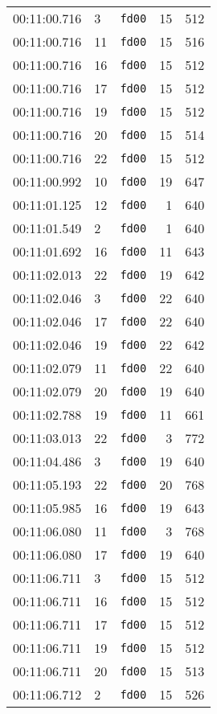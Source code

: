 \documentclass{article}
\begin{document}
\begin{longtable}{lllrr}
00:11:00.716 & 3 & \texttt{fd00} & 15 & 512 \\
00:11:00.716 & 11 & \texttt{fd00} & 15 & 516 \\
00:11:00.716 & 16 & \texttt{fd00} & 15 & 512 \\
00:11:00.716 & 17 & \texttt{fd00} & 15 & 512 \\
00:11:00.716 & 19 & \texttt{fd00} & 15 & 512 \\
00:11:00.716 & 20 & \texttt{fd00} & 15 & 514 \\
00:11:00.716 & 22 & \texttt{fd00} & 15 & 512 \\
00:11:00.992 & 10 & \texttt{fd00} & 19 & 647 \\
00:11:01.125 & 12 & \texttt{fd00} & 1 & 640 \\
00:11:01.549 & 2 & \texttt{fd00} & 1 & 640 \\
00:11:01.692 & 16 & \texttt{fd00} & 11 & 643 \\
00:11:02.013 & 22 & \texttt{fd00} & 19 & 642 \\
00:11:02.046 & 3 & \texttt{fd00} & 22 & 640 \\
00:11:02.046 & 17 & \texttt{fd00} & 22 & 640 \\
00:11:02.046 & 19 & \texttt{fd00} & 22 & 642 \\
00:11:02.079 & 11 & \texttt{fd00} & 22 & 640 \\
00:11:02.079 & 20 & \texttt{fd00} & 19 & 640 \\
00:11:02.788 & 19 & \texttt{fd00} & 11 & 661 \\
00:11:03.013 & 22 & \texttt{fd00} & 3 & 772 \\
00:11:04.486 & 3 & \texttt{fd00} & 19 & 640 \\
00:11:05.193 & 22 & \texttt{fd00} & 20 & 768 \\
00:11:05.985 & 16 & \texttt{fd00} & 19 & 643 \\
00:11:06.080 & 11 & \texttt{fd00} & 3 & 768 \\
00:11:06.080 & 17 & \texttt{fd00} & 19 & 640 \\
00:11:06.711 & 3 & \texttt{fd00} & 15 & 512 \\
00:11:06.711 & 16 & \texttt{fd00} & 15 & 512 \\
00:11:06.711 & 17 & \texttt{fd00} & 15 & 512 \\
00:11:06.711 & 19 & \texttt{fd00} & 15 & 512 \\
00:11:06.711 & 20 & \texttt{fd00} & 15 & 513 \\
00:11:06.712 & 2 & \texttt{fd00} & 15 & 526 \\

\end{longtable}
\end{document}
